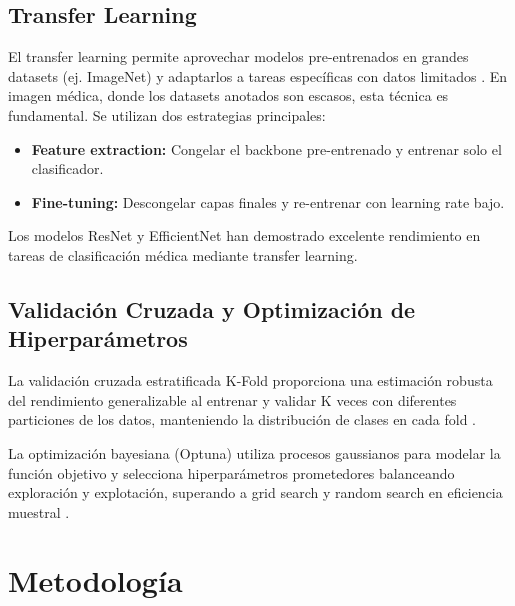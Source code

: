 \documentclass[12pt,a4paper]{article}
\begin{document}
\subsection{Transfer Learning}

El transfer learning permite aprovechar modelos pre-entrenados en grandes datasets (ej. ImageNet) 
y adaptarlos a tareas específicas con datos limitados \cite{pan2010survey}. En imagen médica, donde 
los datasets anotados son escasos, esta técnica es fundamental. Se utilizan dos estrategias principales:

\begin{itemize}
    \item \textbf{Feature extraction:} Congelar el backbone pre-entrenado y entrenar solo el clasificador.
    \item \textbf{Fine-tuning:} Descongelar capas finales y re-entrenar con learning rate bajo.
\end{itemize}

Los modelos ResNet \cite{he2016deep} y EfficientNet \cite{tan2019efficientnet} han demostrado 
excelente rendimiento en tareas de clasificación médica mediante transfer learning.

\subsection{Validación Cruzada y Optimización de Hiperparámetros}

La validación cruzada estratificada K-Fold proporciona una estimación robusta del rendimiento 
generalizable al entrenar y validar K veces con diferentes particiones de los datos, 
manteniendo la distribución de clases en cada fold \cite{kohavi1995study}.

La optimización bayesiana (Optuna) utiliza procesos gaussianos para modelar la función objetivo 
y selecciona hiperparámetros prometedores balanceando exploración y explotación, 
superando a grid search y random search en eficiencia muestral \cite{bergstra2012random, akiba2019optuna}.

\section{Metodología}
\label{sec:metodologia}
\end{document}
